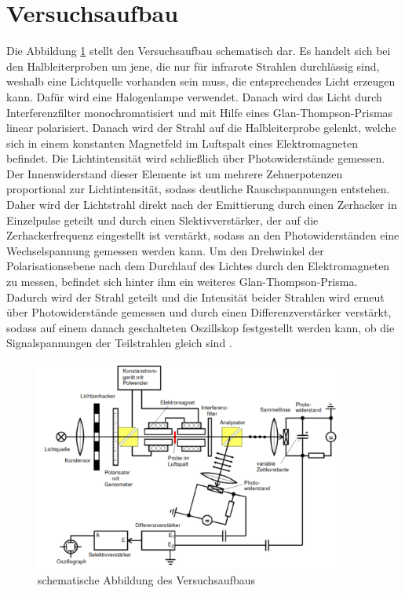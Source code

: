 \section{Versuchsaufbau}
\label{sec:Durchführung}

Die Abbildung \ref{abb1} stellt den Versuchsaufbau schematisch dar.
Es handelt sich bei den Halbleiterproben um jene, die nur 
für infrarote Strahlen durchlässig sind, weshalb eine Lichtquelle vorhanden sein 
muss, die entsprechendes Licht erzeugen kann.
Dafür wird eine Halogenlampe verwendet. 
Danach wird das Licht durch Interferenzfilter monochromatisiert und mit Hilfe eines 
Glan-Thompson-Prismas linear polarisiert. Danach wird der Strahl auf die 
Halbleiterprobe gelenkt, welche sich in einem konstanten Magnetfeld im Luftspalt 
eines Elektromagneten befindet. Die Lichtintensität wird schließlich über 
Photowiderstände gemessen. Der Innenwiderstand dieser Elemente ist um mehrere 
Zehnerpotenzen proportional zur Lichtintensität, sodass deutliche 
Rauschspannungen entstehen. Daher wird der Lichtstrahl direkt nach der 
Emittierung durch einen Zerhacker in Einzelpulse geteilt und durch einen 
Slektivverstärker, der auf die Zerhackerfrequenz eingestellt ist verstärkt,
sodass an den 
Photowiderständen eine Wechselspannung gemessen werden kann. 
Um den Drehwinkel der Polarisationsebene nach dem Durchlauf des Lichtes durch den 
Elektromagneten zu messen, befindet sich hinter ihm ein weiteres Glan-Thompson-Prisma.
Dadurch wird der Strahl geteilt und die Intensität beider Strahlen wird erneut 
über Photowiderstände gemessen und durch einen Differenzverstärker verstärkt,
sodass auf einem danach geschalteten Oszillskop festgestellt werden kann, ob die 
Signalspannungen der Teilstrahlen gleich sind \cite{sample}.

\begin{figure}
    \centering
    \includegraphics[width=0.9\textwidth]{figure/Aufbau.pdf}
    \caption{schematische Abbildung des Versuchsaufbaus \cite{sample}}
    \label{abb1}
\end{figure}

